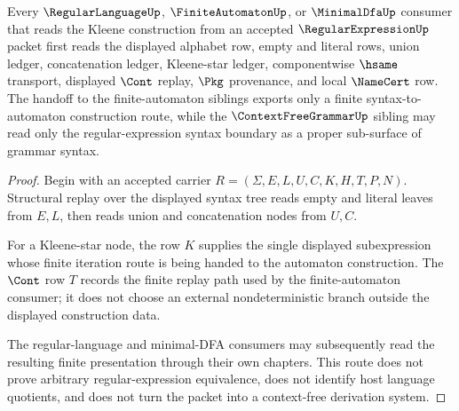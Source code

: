 \begin{theorem}
\label{thm:regular-expression-kleene-automaton-handoff}
Every $\RegularLanguageUp$, $\FiniteAutomatonUp$, or $\MinimalDfaUp$ consumer that reads the Kleene construction from an accepted $\RegularExpressionUp$ packet first reads the displayed alphabet row, empty and literal rows, union ledger, concatenation ledger, Kleene-star ledger, componentwise $\hsame$ transport, displayed $\Cont$ replay, $\Pkg$ provenance, and local $\NameCert$ row. The handoff to the finite-automaton siblings exports only a finite syntax-to-automaton construction route, while the $\ContextFreeGrammarUp$ sibling may read only the regular-expression syntax boundary as a proper sub-surface of grammar syntax.
\end{theorem}
\begin{proof}
Begin with an accepted carrier $R=(\Sigma,E,L,U,C,K,H,T,P,N)$. Structural replay over the displayed syntax tree reads empty and literal leaves from $E,L$, then reads union and concatenation nodes from $U,C$.

For a Kleene-star node, the row $K$ supplies the single displayed subexpression whose finite iteration route is being handed to the automaton construction. The $\Cont$ row $T$ records the finite replay path used by the finite-automaton consumer; it does not choose an external nondeterministic branch outside the displayed construction data.

The regular-language and minimal-DFA consumers may subsequently read the resulting finite presentation through their own chapters. This route does not prove arbitrary regular-expression equivalence, does not identify host language quotients, and does not turn the packet into a context-free derivation system.
\end{proof}


\begin{closurestatus}{\RegularExpressionUp}
  \theoryclosure{\seedClosure}
  \formalstatus{\formalTargetV}
\end{closurestatus}
